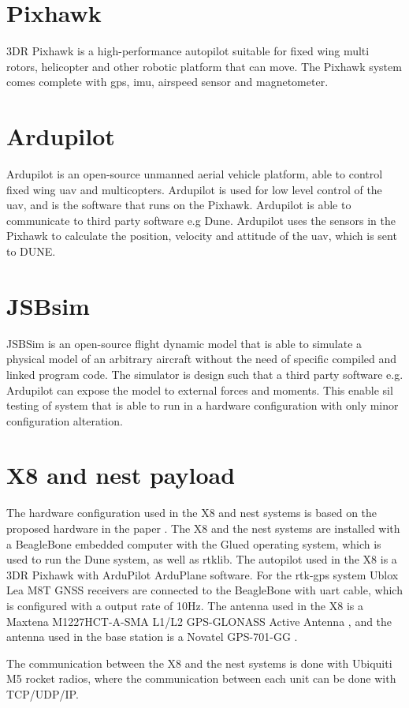 \section{Pixhawk}
3DR Pixhawk is a high-performance autopilot suitable for fixed wing multi rotors, helicopter and other robotic platform that can move. The Pixhawk system comes complete with \gls{gps}, imu, airspeed sensor and magnetometer.
\section{Ardupilot}
Ardupilot is an open-source unmanned aerial vehicle platform, able to control fixed wing \gls{uav} and multicopters. Ardupilot is used for low level control of the \gls{uav}, and is the software that runs on the Pixhawk. Ardupilot is able to communicate to third party software e.g Dune. Ardupilot uses the sensors in the Pixhawk to calculate the position, velocity and attitude of the \gls{uav}, which is sent to DUNE.
\section{JSBsim}
JSBSim \citep{berndt2004jsbsim} is an open-source flight dynamic model that is able to simulate a physical model of an arbitrary aircraft without the need of specific compiled and linked program code. The simulator is design such that a third party software e.g. Ardupilot can expose the model to external forces and moments. This enable \gls{sil} testing of system that is able to run in a hardware configuration with only minor configuration alteration.
\section{X8 and nest payload}
The hardware configuration used in the X8 and nest systems is based on the proposed hardware in the paper \citep{zolich2015unmanned}. The X8 and the nest systems are installed with a BeagleBone embedded computer with the Glued operating system, which is used to run the Dune system, as well as rtklib. The autopilot used in the X8 is a 3DR Pixhawk with ArduPilot ArduPlane software. For the \gls{rtk-gps} system Ublox Lea M8T GNSS receivers \citep{UbloxDataSheet,UbloxReceiverDescription} are connected to the BeagleBone with uart cable, which is configured with a output rate of 10Hz. The antenna used in the X8 is a Maxtena M1227HCT-A-SMA L1/L2 GPS-GLONASS Active Antenna \citep{maxtena}, and the antenna used in the base station is a Novatel GPS-701-GG \citep{novatel}.

The communication between the X8 and the nest systems is done with Ubiquiti M5 rocket \citep{rocketM5} radios, where the communication between each unit can be done with TCP/UDP/IP.
\cleardoublepage